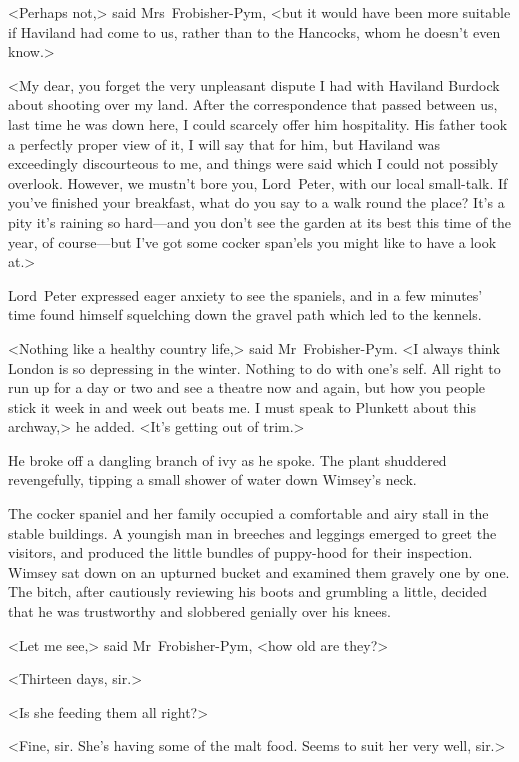 <Perhaps not,> said Mrs~Frobisher-Pym, <but it would have been more suitable if Haviland had come to us, rather than to the Hancocks, whom he doesn't even know.>

<My dear, you forget the very unpleasant dispute I had with Haviland Burdock about shooting over my land. After the correspondence that passed between us, last time he was down here, I could scarcely offer him hospitality. His father took a perfectly proper view of it, I will say that for him, but Haviland was exceedingly discourteous to me, and things were said which I could not possibly overlook. However, we mustn't bore you, Lord~Peter, with our local small-talk. If you've finished your breakfast, what do you say to a walk round the place? It's a pity it's raining so hard—and you don't see the garden at its best this time of the year, of course—but I've got some cocker span'els you might like to have a look at.>

Lord~Peter expressed eager anxiety to see the spaniels, and in a few minutes' time found himself squelching down the gravel path which led to the kennels.

<Nothing like a healthy country life,> said Mr~Frobisher-Pym. <I always think London is so depressing in the winter. Nothing to do with one's self. All right to run up for a day or two and see a theatre now and again, but how you people stick it week in and week out beats me. I must speak to Plunkett about this archway,> he added. <It's getting out of trim.>

He broke off a dangling branch of ivy as he spoke. The plant shuddered revengefully, tipping a small shower of water down Wimsey's neck.

The cocker spaniel and her family occupied a comfortable and airy stall in the stable buildings. A youngish man in breeches and leggings emerged to greet the visitors, and produced the little bundles of puppy-hood for their inspection. Wimsey sat down on an upturned bucket and examined them gravely one by one. The bitch, after cautiously reviewing his boots and grumbling a little, decided that he was trustworthy and slobbered genially over his knees.

<Let me see,> said Mr~Frobisher-Pym, <how old are they?>

<Thirteen days, sir.>

<Is she feeding them all right?>

<Fine, sir. She's having some of the malt food. Seems to suit her very well, sir.>

